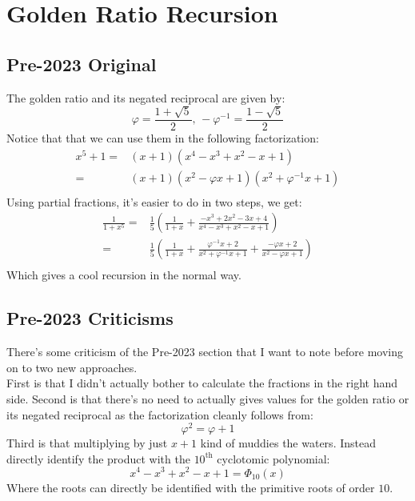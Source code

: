 
\section{Golden Ratio Recursion}

\subsection{Pre-2023 Original}
The golden ratio and its negated reciprocal are given by:
\[\varphi = \frac{1+\sqrt{5}}{2},\,-\varphi^{-1} = \frac{1-\sqrt{5}}{2}\]
Notice that that we can use them in the following factorization: 
\begin{equation*}
\begin{aligned}
	x^5+1 =& (x+1)(x^4-x^3+x^2-x+1)\\
	=& (x+1)(x^2-\varphi x+1)(x^2+\varphi^{-1} x+1)\\
\end{aligned}
\end{equation*}
Using partial fractions, 
it's easier to do in two steps,
we get:
\begin{equation*}
\begin{aligned}
	\frac{1}{1+x^5}=& \frac{1}{5}\left(\frac{1}{1+x} +\frac{-x^3+2x^2-3x+4}{x^4-x^3+x^2-x+1}\right)\\
	=& \frac{1}{5}\left(\frac{1}{1+x}+\frac{\varphi^{-1}x+2}{x^2+\varphi^{-1} x+1}+\frac{-\varphi x+2}{x^2-\varphi x + 1}\right) \\
\end{aligned}
\end{equation*}
Which gives a cool recursion in the normal way.

\subsection{Pre-2023 Criticisms}
There's some criticism of the Pre-2023 section that I want to note before moving on to two new approaches.
\\

First is that I didn't actually bother to calculate the fractions in the right hand side.
Second is that there's no need to actually gives values for the golden ratio or its negated reciprocal as the factorization cleanly follows from:
\[\varphi^2=\varphi+1\]
Third is that multiplying by just $x+1$ kind of muddies the waters.
Instead directly identify the product with the $10^\text{th}$ cyclotomic polynomial:
\[x^4-x^3+x^2-x+1 = \Phi_{10}(x)\]
Where the roots can directly be identified with the primitive roots of order $10$.
\\

